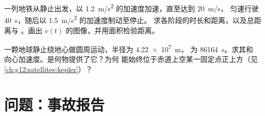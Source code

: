 \begin{exercise}[$\star\star\star$]\label{exo:g12:kinematics-2d:14}
一列地铁从静止出发，以 \qty{1.2}{m/s^2} 的加速度加速，直至达到 \qty{20}{m/s}，
匀速行驶 \qty{40}{s}，随后以 \qty{1.5}{m/s^2} 的加速度制动至停止。
求各阶段的时长和距离，以及总距离与
。画出 $v(t)$ 的图像，并用面积检验距离。
\end{exercise}

\begin{exercise}[$\star\star\star$]\label{exo:g12:kinematics-2d:15}
一颗地球静止绕地心做圆周运动，半径为 \qty{4.22e7}{m}，
为 \qty{86164}{s}。求其和
向心加速度。是何物提供了它？为何
能始终位于赤道上空某一固定点正上方（见\cref{ch:g12:satellites-kepler}）？
\end{exercise}

\section{问题：事故报告}

